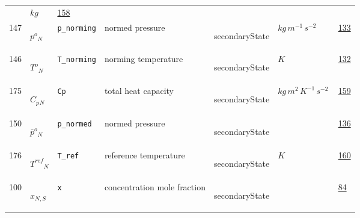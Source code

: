 \begin{longtable}{|p{1cm}|p{2.5cm}|p{4.5cm}|p{8cm}|p{3.0cm}|p{3cm}|p{1cm}|}
             & $ kg \, $
             &                 \hyperlink{"e:158"}{ 158 }
                 \\
            147
             & \hypertarget{"v:147"}{ $ {{p^o}}{_{N}} $}
             & \verb|p_norming|
             & normed pressure
             & \begin{lay}secondaryState \end{lay}
             & $ kg \,m^{-1} \,s^{-2} \, $
             &                 \hyperlink{"e:133"}{ 133 }
                 \\
            146
             & \hypertarget{"v:146"}{ $ {{T^o}}{_{N}} $}
             & \verb|T_norming|
             & norming temperature
             & \begin{lay}secondaryState \end{lay}
             & $ K \, $
             &                 \hyperlink{"e:132"}{ 132 }
                 \\
            175
             & \hypertarget{"v:175"}{ $ {{C_p}}{_{N}} $}
             & \verb|Cp|
             & total heat capacity
             & \begin{lay}secondaryState \end{lay}
             & $ kg \,m^{2} \,K^{-1} \,s^{-2} \, $
             &                 \hyperlink{"e:159"}{ 159 }
                 \\
            150
             & \hypertarget{"v:150"}{ $ {{\bar{p}^o}}{_{N}} $}
             & \verb|p_normed|
             & normed pressure
             & \begin{lay}secondaryState \end{lay}
             & $  $
             &                 \hyperlink{"e:136"}{ 136 }
                 \\
            176
             & \hypertarget{"v:176"}{ $ {{T^{ref}}}{_{N}} $}
             & \verb|T_ref|
             & reference temperature
             & \begin{lay}secondaryState \end{lay}
             & $ K \, $
             &                 \hyperlink{"e:160"}{ 160 }
                 \\
            100
             & \hypertarget{"v:100"}{ $ {x}{_{N, S}} $}
             & \verb|x|
             & concentration mole fraction
             & \begin{lay}secondaryState \end{lay}
             & $  $
             &                 \hyperlink{"e:84"}{ 84 }
                 \\

\end{longtable}
